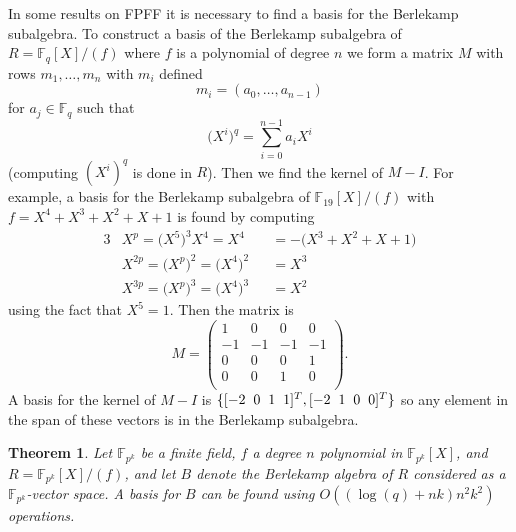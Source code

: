 \documentclass{article}
\newcounter{dummy} \numberwithin{dummy}{section}
\theoremstyle{plain}
\newtheorem{thm}[dummy]{Theorem}
\theoremstyle{definition}
\def\Fq {{ \mathbb{F} _ {q} }}
\def\FpE {{ \mathbb{F} _ {p^k} }}
\begin{document}
		In some results on FPFF it is necessary to find a basis for the Berlekamp subalgebra. To construct a basis of the Berlekamp subalgebra of $R=\Fq[X]/(f)$ where $f$ is a polynomial of degree $n$ we form a matrix $M$ with rows $m_1,\ldots,m_n$ with $m_i$ defined 
		\[ m_i=(a_0,\ldots,a_{n-1}) \]
		\noindent for $a_j \in \Fq$ such that 
		\[ \bigl(X^i\bigr)^q = \sum_{i=0}^{n-1}{a_iX^i} \]
		(computing $(X^i)^q$ is done in $R$). Then we find the kernel of $M-I$. For example, a basis for the Berlekamp subalgebra of $\mathbb{F}_{19}[X]/(f)$ with $f=X^4+X^3+X^2+X+1$ is found by computing
		\begin{alignat*}{3}
		    &X^{p}  = \bigl( X^5 \bigr)^3 X^4 = X^4               &&= -\bigl( X^3+X^2+X+1 \bigr)  \\
				&X^{2p} = \bigl(X^p \bigr)^2 = \bigl( X^4 \bigr)^2 &&= X^3 \\
				&X^{3p} = \bigl(X^p \bigr)^3 = \bigl( X^4 \bigr)^3 &&= X^2 
		\end{alignat*}
		\noindent using the fact that $X^5=1.$ Then the matrix is
      \[M=
      \begin{pmatrix}
          1     &  0    &  0     & 0     \\
          -1    & -1    & -1     & -1    \\
		      0     &  0    & 0      & 1     \\			
		      0     &  0    & 1      & 0     \\			
      \end{pmatrix}
			.\]
		A basis for the kernel of $M-I$ is $\{ [-2\hspace{2mm}0\hspace{2mm}1\hspace{2mm}1]^T,[-2\hspace{2mm}1\hspace{2mm}0\hspace{2mm}0]^T \}$ so any element in the span of these vectors is in the Berlekamp subalgebra. 
		
		\begin{thm} 
		\label{THM:BERLEBASIS}
		    Let $\FpE$ be a finite field, $f$ a degree $n$ polynomial in $\FpE[X]$, and $R = \FpE[X]/(f)$, and let $B$ denote the Berlekamp algebra of $R$ considered as a $\FpE$-vector space. A basis for $B$ can be found using $O((\log(q)+nk)n^2k^2)$ operations. 
		\end{thm}
		
\end{document}
